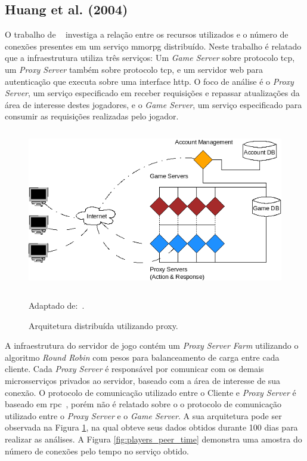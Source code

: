 \subsection{Huang et al. (2004)}
\label{sec:huang}



O trabalho de ~\cite{1417630} investiga a relação entre os recursos utilizados e o número de conexões presentes em um serviço \ac{mmorpg} distribuído.
%
Neste trabalho é relatado que a infraestrutura utiliza três serviços: Um \textit{Game Server} sobre protocolo \ac{tcp}, um \textit{Proxy Server} também sobre protocolo \ac{tcp}, e um servidor web para autenticação que executa sobre uma interface \ac{http}.
%
O foco de análise é o \textit{Proxy Server}, um serviço especificado em receber requisições e repassar atualizações da área de interesse destes jogadores, e o \textit{Game Server}, um serviço especificado para consumir as requisições realizadas pelo jogador.



\begin{figure}[htb!]
\caption{Arquitetura distribuída utilizando proxy.}
\label{fig:game_with_proxy}
\includegraphics[height=7cm]{img/cap2/game_with_proxy.png}
\centering

Adaptado de:~\cite{1417630}.
\end{figure}



A infraestrutura do servidor de jogo contém um \textit{Proxy Server Farm} utilizando o algoritmo \textit{Round Robin} com pesos para balanceamento de carga entre cada cliente.
%
Cada \textit{Proxy Server} é responsável por comunicar com os demais microsserviços privados ao servidor, baseado com a área de interesse de sua conexão.
%
O protocolo de comunicação utilizado entre o Cliente e \textit{Proxy Server} é baseado em \ac{rpc}~\cite{faber, borella}, porém não é relatado sobre o o protocolo de comunicação utilizado entre o \textit{Proxy Server} e o \textit{Game Server}.
%
A sua arquitetura pode ser observada na Figura \ref{fig:game_with_proxy}, na qual obteve seus dados obtidos durante 100 dias para realizar as análises.
%
A Figura \ref{fig:players_peer_time} demonstra uma amostra do número de conexões pelo tempo no serviço obtido.



